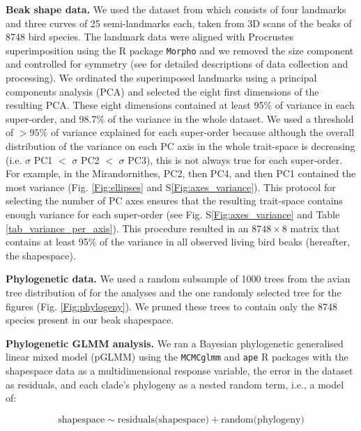 \documentclass[12pt,letterpaper]{article}
\begin{document}
\textbf{Beak shape data.}
We used the dataset from \cite{cooney2017mega,chira2020signature,hughes2022global} which consists of four landmarks and three curves of 25 semi-landmarks each, taken from 3D scans of  the beaks of 8748 bird species.
The landmark data were aligned with Procrustes superimposition using the R package \texttt{Morpho} \cite{Rcore,Morpho} and we removed the size component and controlled for symmetry (see \cite{cooney2017mega,chira2020signature,hughes2022global} for detailed descriptions of data collection and processing).
We ordinated the superimposed landmarks using a principal components analysis (PCA) and selected the eight first dimensions of the resulting PCA.
These eight dimensions contained at least 95\% of variance in each super-order, and 98.7\% of the variance in the whole dataset.
We used a threshold of $>95$\% of variance explained for each super-order because although the overall distribution of the variance on each PC axis in the whole trait-space is decreasing (i.e.
$\sigma$ PC1 $<$ $\sigma$ PC2 $<$ $\sigma$ PC3), this is not always true for each super-order.
For example, in the Mirandornithes, PC2, then PC4, and then PC1 contained the most variance (Fig. \ref{Fig:ellipses} and S\ref{Fig:axes_variance}).
This protocol for selecting the number of PC axes ensures that the resulting trait-space contains enough variance for each super-order (see Fig. S\ref{Fig:axes_variance} and Table \ref{tab_variance_per_axis}).
This procedure resulted in an $8748 \times 8$ matrix that contains at least 95\% of the variance in all observed living bird beaks (hereafter, the shapespace).

\textbf{Phylogenetic data.}
We used a random subsample of 1000 trees from the avian tree distribution of \cite{jetz2012global} for the analyses and the one randomly selected tree for the figures (Fig. \ref{Fig:phylogeny}).
We pruned these trees to contain only the 8748 species present in our beak shapespace.

\textbf{Phylogenetic GLMM analysis.}
We ran a Bayesian phylogenetic generalised linear mixed model (pGLMM) using the \texttt{MCMCglmm} and \texttt{ape} R packages \cite{MCMCglmm, ape} with the shapespace data as a multidimensional response variable, the error in the dataset as residuals, and each clade's phylogeny as a nested random term, i.e., a model of:

\begin{equation}
\text{shapespace} \mathtt{\sim} \text{residuals(shapespace)} + \text{random(phylogeny)}
\end{equation}
\end{document}

